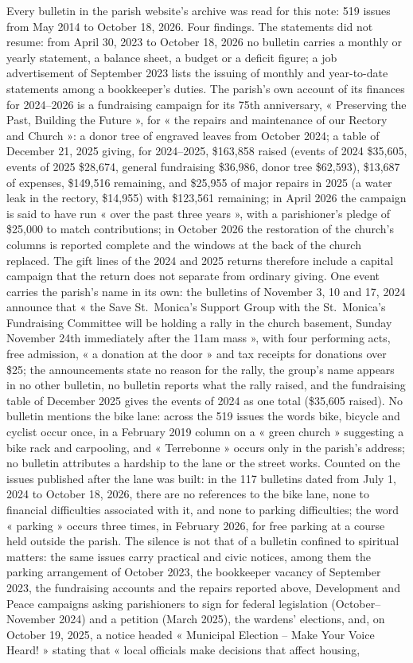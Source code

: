 \documentclass[11pt,letterpaper]{article}
\begin{document}
Every bulletin in the parish website's archive was read for this note: 519 issues from May 2014 to October 18, 2026. Four findings. The statements did not resume: from April 30, 2023 to October 18, 2026 no bulletin carries a monthly or yearly statement, a balance sheet, a budget or a deficit figure; a job advertisement of September 2023 lists the issuing of monthly and year-to-date statements among a bookkeeper's duties. The parish's own account of its finances for 2024--2026 is a fundraising campaign for its 75th anniversary, « Preserving the Past, Building the Future », for « the repairs and maintenance of our Rectory and Church »: a donor tree of engraved leaves from October 2024; a table of December 21, 2025 giving, for 2024--2025, \$163,858 raised (events of 2024 \$35,605, events of 2025 \$28,674, general fundraising \$36,986, donor tree \$62,593), \$13,687 of expenses, \$149,516 remaining, and \$25,955 of major repairs in 2025 (a water leak in the rectory, \$14,955) with \$123,561 remaining; in April 2026 the campaign is said to have run « over the past three years », with a parishioner's pledge of \$25,000 to match contributions; in October 2026 the restoration of the church's columns is reported complete and the windows at the back of the church replaced. The gift lines of the 2024 and 2025 returns therefore include a capital campaign that the return does not separate from ordinary giving. One event carries the parish's name in its own: the bulletins of November 3, 10 and 17, 2024 announce that « the Save St.~Monica's Support Group with the St.~Monica's Fundraising Committee will be holding a rally in the church basement, Sunday November 24th immediately after the 11am mass », with four performing acts, free admission, « a donation at the door » and tax receipts for donations over \$25; the announcements state no reason for the rally, the group's name appears in no other bulletin, no bulletin reports what the rally raised, and the fundraising table of December 2025 gives the events of 2024 as one total (\$35,605 raised). No bulletin mentions the bike lane: across the 519 issues the words bike, bicycle and cyclist occur once, in a February 2019 column on a « green church » suggesting a bike rack and carpooling, and « Terrebonne » occurs only in the parish's address; no bulletin attributes a hardship to the lane or the street works. Counted on the issues published after the lane was built: in the 117 bulletins dated from July 1, 2024 to October 18, 2026, there are no references to the bike lane, none to financial difficulties associated with it, and none to parking difficulties; the word « parking » occurs three times, in February 2026, for free parking at a course held outside the parish. The silence is not that of a bulletin confined to spiritual matters: the same issues carry practical and civic notices, among them the parking arrangement of October 2023, the bookkeeper vacancy of September 2023, the fundraising accounts and the repairs reported above, Development and Peace campaigns asking parishioners to sign for federal legislation (October--November 2024) and a petition (March 2025), the wardens' elections, and, on October 19, 2025, a notice headed « Municipal Election -- Make Your Voice Heard! » stating that « local officials make decisions that affect housing, 
\end{document}

